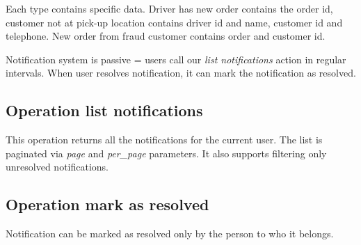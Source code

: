 		Each type contains specific data. Driver has new order contains the order id, customer not at pick-up location contains driver id and name, customer id and telephone. New order from fraud customer contains order and customer id.
		
		
		Notification system is passive = users call our \textit{list notifications} action in regular intervals. When user resolves notification, it can mark the notification as resolved.
		
		
		\subsection{Operation list notifications}
			This operation returns all the notifications for the current user. The list is paginated via \textit{page} and \textit{per\_page} parameters. It also supports filtering only unresolved notifications.
		\subsection{Operation mark as resolved}
			Notification can be marked as resolved only by the person to who it belongs. 